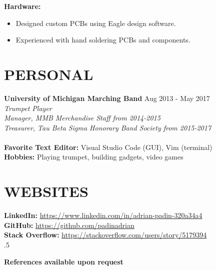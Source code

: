 \documentclass[margin,11pt]{res}
\begin{document}
\begin{resume}
\vspace{-10pt}
\textbf{Hardware:}
\begin{itemize}
	\itemsep -2pt
    \item Designed custom PCBs using Eagle design software.
    \item Experienced with hand soldering PCBs and components.
\end{itemize}

\vspace{-10pt}
\section{PERSONAL}
\textbf{University of Michigan Marching Band} \hfill Aug 2013 - May 2017\\
\textsl{Trumpet Player}\\
\textsl{Manager, MMB Merchandise Staff from 2014-2015}\\
\textsl{Treasurer, Tau Beta Sigma Honorary Band Society from 2015-2017}\\
\\
\textbf{Favorite Text Editor:} Visual Studio Code (GUI), Vim (terminal)\\
\textbf{Hobbies:} Playing trumpet, building gadgets, video games

\section{WEBSITES}
\textbf{LinkedIn:}
\href{https://www.linkedin.com/in/adrian-padin-320a34a4}{https://www.linkedin.com/in/adrian-padin-320a34a4}\\
\textbf{GitHub:}
\href{https://github.com/padinadrian}{https://github.com/padinadrian}\\
\textbf{Stack Overflow:}
\href{https://stackoverflow.com/users/story/5179394}{https://stackoverflow.com/users/story/5179394}\\


\vspace{10pt}
\moveleft.5\hoffset\centerline{\large\bf References available upon request}

\end{resume}
\end{document}
